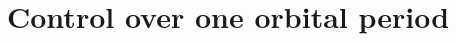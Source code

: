 \documentclass[AMA,STIX1COL]{WileyNJD-v2}
\newcommand{\bluetext}{\textcolor{blue}}
\newcommand{\com}[1]{\bluetext{***#1***}}
\begin{document}

\section{Control over one orbital period} \label{sec2}
\end{document}
